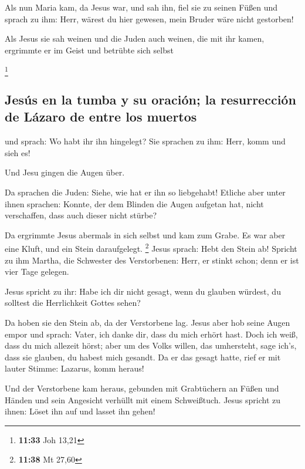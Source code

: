  Als nun Maria kam, da Jesus war, und sah ihn, fiel sie
zu seinen Füßen und sprach zu ihm: Herr, wärest du hier gewesen, mein
Bruder wäre nicht gestorben!

 Als Jesus sie sah weinen und die Juden auch weinen, die
mit ihr kamen, ergrimmte er im Geist und betrübte sich selbst

\footnote{\textbf{11:33} Joh 13,21}

\hypertarget{jesuxfas-en-la-tumba-y-su-oraciuxf3n-la-resurrecciuxf3n-de-luxe1zaro-de-entre-los-muertos}{%
\subsection{Jesús en la tumba y su oración; la resurrección de Lázaro de
entre los
muertos}\label{jesuxfas-en-la-tumba-y-su-oraciuxf3n-la-resurrecciuxf3n-de-luxe1zaro-de-entre-los-muertos}}

 und sprach: Wo habt ihr ihn hingelegt? Sie sprachen zu
ihm: Herr, komm und sieh es!

 Und Jesu gingen die Augen über.

 Da sprachen die Juden: Siehe, wie hat er ihn so
liebgehabt!  Etliche aber unter ihnen sprachen: Konnte,
der dem Blinden die Augen aufgetan hat, nicht verschaffen, dass auch
dieser nicht stürbe?

 Da ergrimmte Jesus abermals in sich selbst und kam zum
Grabe. Es war aber eine Kluft, und ein Stein daraufgelegt. \footnote{\textbf{11:38}
  Mt 27,60}  Jesus sprach: Hebt den Stein ab! Spricht zu
ihm Martha, die Schwester des Verstorbenen: Herr, er stinkt schon; denn
er ist vier Tage gelegen.

 Jesus spricht zu ihr: Habe ich dir nicht gesagt, wenn du
glauben würdest, du solltest die Herrlichkeit Gottes sehen?

 Da hoben sie den Stein ab, da der Verstorbene lag. Jesus
aber hob seine Augen empor und sprach: Vater, ich danke dir, dass du
mich erhört hast.  Doch ich weiß, dass du mich allezeit
hörst; aber um des Volks willen, das umhersteht, sage ich's, dass sie
glauben, du habest mich gesandt.  Da er das gesagt hatte,
rief er mit lauter Stimme: Lazarus, komm heraus!

 Und der Verstorbene kam heraus, gebunden mit Grabtüchern
an Füßen und Händen und sein Angesicht verhüllt mit einem Schweißtuch.
Jesus spricht zu ihnen: Löset ihn auf und lasset ihn gehen!

